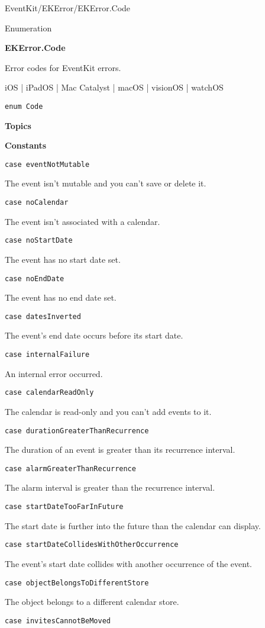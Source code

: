 \documentclass{article}
\title{}
\author{}
\date{}
\begin{document}
EventKit/EKError/EKError.Code

Enumeration

\textbf{EKError.Code}

Error codes for EventKit errors.

iOS | iPadOS | Mac Catalyst | macOS | visionOS | watchOS

\texttt{enum Code}

\textbf{Topics}

\textbf{Constants}

\texttt{case eventNotMutable}

The event isn't mutable and you can't save or delete it.

\texttt{case noCalendar}

The event isn't associated with a calendar.

\texttt{case noStartDate}

The event has no start date set.

\texttt{case noEndDate}

The event has no end date set.

\texttt{case datesInverted}

The event's end date occurs before its start date.

\texttt{case internalFailure}

An internal error occurred.

\texttt{case calendarReadOnly}

The calendar is read-only and you can't add events to it.

\texttt{case durationGreaterThanRecurrence}

The duration of an event is greater than its recurrence interval.

\texttt{case alarmGreaterThanRecurrence}

The alarm interval is greater than the recurrence interval.

\texttt{case startDateTooFarInFuture}

The start date is further into the future than the calendar can display.

\texttt{case startDateCollidesWithOtherOccurrence}

The event's start date collides with another occurrence of the event.

\texttt{case objectBelongsToDifferentStore}

The object belongs to a different calendar store.

\texttt{case invitesCannotBeMoved}
\end{document}
